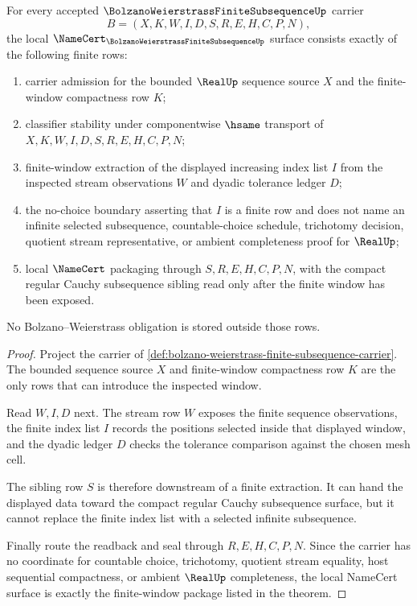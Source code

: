 \begin{theorem}
\label{thm:bolzano-weierstrass-finite-subsequence-namecert-obligations}
For every accepted $\BolzanoWeierstrassFiniteSubsequenceUp$ carrier
$$
B=(X,K,W,I,D,S,R,E,H,C,P,N),
$$
the local $\NameCert_{\BolzanoWeierstrassFiniteSubsequenceUp}$ surface consists exactly of the following finite rows:
\begin{enumerate}
\item carrier admission for the bounded $\RealUp$ sequence source $X$ and the finite-window compactness row $K$;
\item classifier stability under componentwise $\hsame$ transport of $X,K,W,I,D,S,R,E,H,C,P,N$;
\item finite-window extraction of the displayed increasing index list $I$ from the inspected stream observations $W$ and dyadic tolerance ledger $D$;
\item the no-choice boundary asserting that $I$ is a finite row and does not name an infinite selected subsequence, countable-choice schedule, trichotomy decision, quotient stream representative, or ambient completeness proof for $\RealUp$;
\item local $\NameCert$ packaging through $S,R,E,H,C,P,N$, with the compact regular Cauchy subsequence sibling read only after the finite window has been exposed.
\end{enumerate}
No Bolzano--Weierstrass obligation is stored outside those rows.
\end{theorem}
\begin{proof}
Project the carrier of \autoref{def:bolzano-weierstrass-finite-subsequence-carrier}. The bounded sequence source $X$ and finite-window compactness row $K$ are the only rows that can introduce the inspected window.

Read $W,I,D$ next. The stream row $W$ exposes the finite sequence observations, the finite index list $I$ records the positions selected inside that displayed window, and the dyadic ledger $D$ checks the tolerance comparison against the chosen mesh cell.

The sibling row $S$ is therefore downstream of a finite extraction. It can hand the displayed data toward the compact regular Cauchy subsequence surface, but it cannot replace the finite index list with a selected infinite subsequence.

Finally route the readback and seal through $R,E,H,C,P,N$. Since the carrier has no coordinate for countable choice, trichotomy, quotient stream equality, host sequential compactness, or ambient $\RealUp$ completeness, the local NameCert surface is exactly the finite-window package listed in the theorem.
\end{proof}

